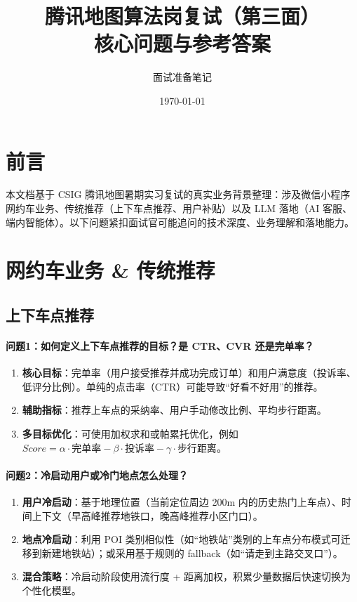 \documentclass[12pt,a4paper]{article}
\title{\textbf{腾讯地图算法岗复试（第三面）\\ 核心问题与参考答案}}
\author{面试准备笔记}
\date{\today}
\begin{document}
\maketitle

\section*{前言}
本文档基于 CSIG 腾讯地图暑期实习复试的真实业务背景整理：涉及微信小程序网约车业务、传统推荐（上下车点推荐、用户补贴）以及 LLM 落地（AI 客服、端内智能体）。以下问题紧扣面试官可能追问的技术深度、业务理解和落地能力。

\section{网约车业务 \& 传统推荐}

\subsection{上下车点推荐}

\paragraph{问题1：如何定义上下车点推荐的目标？是 CTR、CVR 还是完单率？}
\begin{enumerate}[label=(\arabic*)]
\item \textbf{核心目标}：完单率（用户接受推荐并成功完成订单）和用户满意度（投诉率、低评分比例）。单纯的点击率（CTR）可能导致“好看不好用”的推荐。
\item \textbf{辅助指标}：推荐上车点的采纳率、用户手动修改比例、平均步行距离。
\item \textbf{多目标优化}：可使用加权求和或帕累托优化，例如 $Score = \alpha \cdot \text{完单率} - \beta \cdot \text{投诉率} - \gamma \cdot \text{步行距离}$。
\end{enumerate}

\paragraph{问题2：冷启动用户或冷门地点怎么处理？}
\begin{enumerate}[label=(\arabic*)]
\item \textbf{用户冷启动}：基于地理位置（当前定位周边 200m 内的历史热门上车点）、时间上下文（早高峰推荐地铁口，晚高峰推荐小区门口）。
\item \textbf{地点冷启动}：利用 POI 类别相似性（如“地铁站”类别的上车点分布模式可迁移到新建地铁站）；或采用基于规则的 fallback（如“请走到主路交叉口”）。
\item \textbf{混合策略}：冷启动阶段使用流行度 + 距离加权，积累少量数据后快速切换为个性化模型。
\end{enumerate}
\end{document}
